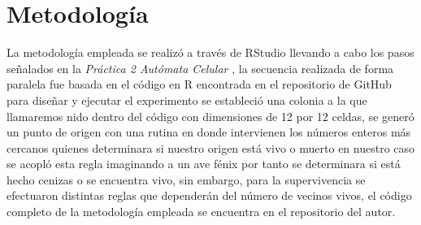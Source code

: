 \documentclass[a4paper]{article}
\begin{document}
\section{Metodología}
\justify
La metodología empleada se realizó a través de RStudio \cite{RStudio} llevando a cabo los pasos señalados en la \textit{Práctica 2 Autómata Celular} \cite{p2}, la secuencia realizada de forma paralela fue basada en el código en R \cite{p2Git} encontrada en el repositorio de GitHub \cite{Git} para diseñar y ejecutar el experimento se estableció una colonia a la que llamaremos nido dentro del código con dimensiones de 12 por 12 celdas, se generó un punto de origen con una rutina en donde intervienen los números enteros más cercanos quienes determinara si nuestro origen está vivo o muerto en nuestro caso se acopló esta regla imaginando a un ave fénix por tanto se determinara si está hecho cenizas o se encuentra vivo, sin embargo, para la supervivencia se efectuaron distintas reglas que dependerán del número de vecinos vivos, el código completo de la metodología empleada se encuentra en el repositorio \cite{gitadrian} del autor.
\end{document}
